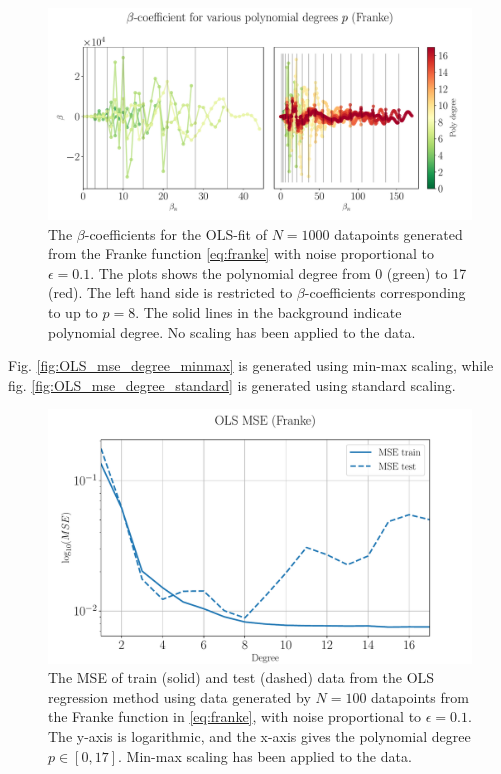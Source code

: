 \documentclass[%
reprint,
amsmath,amssymb,
aps,
pra,
]{revtex4-2}
\begin{document}
\begin{figure}[H]
	\hspace{-0.5cm}
	\includegraphics[width=1.25\linewidth]{Python/Figures/OLS/OLS_betano_scaling_1000.pdf}
	\caption{The \(\beta\)-coefficients for the OLS-fit of \(N=1000\) datapoints generated from the Franke function \eqref{eq:franke} with noise proportional to \(\epsilon=0.1\). The plots shows the polynomial degree from 0 (green) to 17 (red). The left hand side is restricted to \(\beta\)-coefficients corresponding to up to \(p=8\). The solid lines in the background indicate polynomial degree. No scaling has been applied to the data.}
\label{fig:OLS_beta_degree_1000}
\end{figure}


Fig. \eqref{fig:OLS_mse_degree_minmax} is generated using min-max scaling, while fig. \eqref{fig:OLS_mse_degree_standard} is generated using standard scaling.
\begin{figure}[H]
	\centering
	\includegraphics[width=\linewidth]{Python/Figures/OLS/OLS_MSE_MINMAX.pdf}
	\caption{The MSE of train (solid) and test (dashed) data from the OLS regression method using data generated by \(N=100\) datapoints from the Franke function in \eqref{eq:franke}, with noise proportional to \(\epsilon=0.1\). The y-axis is logarithmic, and the x-axis gives the polynomial degree \(p\in[0,17]\). Min-max scaling has been applied to the data.}
	\label{fig:OLS_mse_degree_minmax}
\end{figure}
\end{document}
